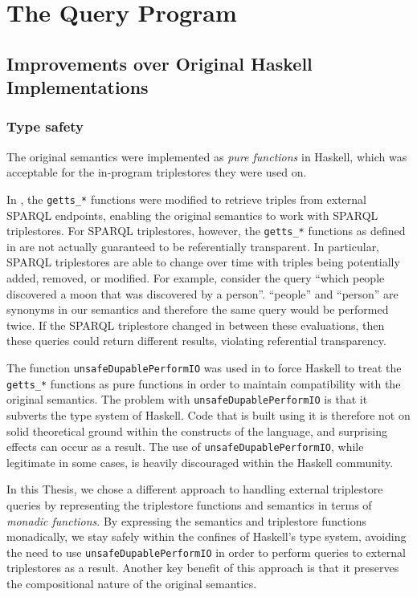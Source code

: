 \documentclass[../main.tex]{subfiles}
\begin{document}
\chapter{The Query Program}

\label{chapter:implementation}

\section{Improvements over Original Haskell Implementations}

\subsection{Type safety}

The original semantics were implemented as {\em pure functions} in Haskell, which was acceptable for the in-program triplestores they were used on.

In \cite{agboola2015extensible}, the \texttt{getts\_*} functions were modified to retrieve triples from external SPARQL endpoints, enabling the original
semantics to work with SPARQL triplestores.  For SPARQL triplestores, however, the \texttt{getts\_*} functions as defined in \cite{agboola2015extensible} are not actually guaranteed to be referentially transparent. In particular, SPARQL triplestores are able to change over time with triples being potentially added, removed, or modified.
For example, consider the query ``which people discovered a moon that was discovered by a person''.
``people'' and ``person'' are synonyms in our semantics and therefore the same query would be performed twice.  If the SPARQL triplestore changed in between these evaluations,
then these queries could return different results, violating referential transparency.

The function \texttt{unsafeDupablePerformIO} was used in \cite{agboola2015extensible} to force Haskell to treat the \texttt{getts\_*} functions as pure functions
in order to maintain compatibility with the original semantics. The problem with \texttt{unsafeDupablePerformIO} is that it subverts the type system of Haskell.  Code that is built using it is therefore not on
solid theoretical ground within the constructs of the language, and surprising effects can occur as a result.  The use of \texttt{unsafeDupablePerformIO}, while
legitimate in some cases, is heavily discouraged within the Haskell community\cite{tlmvconsensus}.

In this Thesis, we chose a different approach to handling external triplestore queries by representing the triplestore functions and semantics in terms of {\em monadic functions}.
By expressing the semantics and triplestore functions monadically, we stay safely within the confines of Haskell's type system, avoiding
the need to use \texttt{unsafeDupablePerformIO} in order to perform queries to external triplestores as a result.  Another key benefit of this approach is that it preserves the compositional nature of the original semantics.
\end{document}

